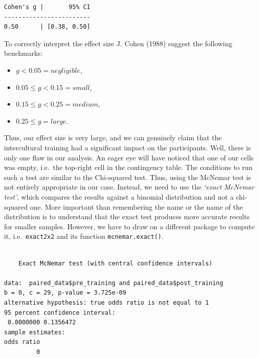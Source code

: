 \documentclass[
  letterpaper,
  DIV=11,
  numbers=noendperiod]{scrreprt}
\newenvironment{Shaded}{\begin{snugshade}}{\end{snugshade}}
\newcommand{\FunctionTok}[1]{\textcolor[rgb]{0.28,0.35,0.67}{#1}}
\newcommand{\NormalTok}[1]{\textcolor[rgb]{0.00,0.23,0.31}{#1}}
\newcommand{\SpecialCharTok}[1]{\textcolor[rgb]{0.37,0.37,0.37}{#1}}
\begin{document}
\begin{verbatim}
Cohen's g |       95% CI
------------------------
0.50      | [0.38, 0.50]
\end{verbatim}

To correctly interpret the effect size J. Cohen (1988) suggest the
following benchmarks:

\begin{itemize}
\item
  \(g < 0.05 = negligible\),
\item
  \(0.05 \leq g < 0.15 = small\),
\item
  \(0.15 \leq g < 0.25 = medium\),
\item
  \(0.25 \leq g = large\).
\end{itemize}

Thus, our effect size is very large, and we can genuinely claim that the
intercultural training had a significant impact on the participants.
Well, there is only one flaw in our analysis. An eager eye will have
noticed that one of our cells was empty, i.e.~the top-right cell in the
contingency table. The conditions to run such a test are similar to the
Chi-squared test. Thus, using the McNemar test is not entirely
appropriate in our case. Instead, we need to use the \emph{`exact
McNemar test'}, which compares the results against a binomial
distribution and not a chi-squared one. More important than remembering
the name or the name of the distribution is to understand that the exact
test produces more accurate results for smaller samples. However, we
have to draw on a different package to compute it,
i.e.~\texttt{exact2x2} and its function \texttt{mcnemar.exact()}.

\begin{Shaded}
\end{Shaded}

\begin{verbatim}

    Exact McNemar test (with central confidence intervals)

data:  paired_data$pre_training and paired_data$post_training
b = 0, c = 29, p-value = 3.725e-09
alternative hypothesis: true odds ratio is not equal to 1
95 percent confidence interval:
 0.0000000 0.1356472
sample estimates:
odds ratio 
         0 
\end{verbatim}
\end{document}
